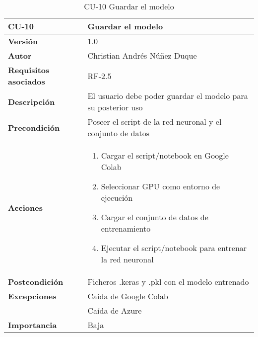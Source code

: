\begin{table}[p]
	\centering
	\begin{tabularx}{\linewidth}{ p{} p{} }
		\toprule
		\textbf{CU-10}    & \textbf{Guardar el modelo}\\
		\toprule
		\textbf{Versión}              & 1.0    \\
		\textbf{Autor}                & Christian Andrés Núñez Duque \\
		\textbf{Requisitos asociados} & RF-2.5 \\
		\textbf{Descripción}          & El usuario debe poder guardar el modelo para su posterior uso \\
		\textbf{Precondición}         & Poseer el script de la red neuronal y el conjunto de datos \\
		\textbf{Acciones}             &
		\begin{enumerate}
			\def\labelenumi{\arabic{enumi}.}
			\tightlist
			\item Cargar el script/notebook en Google Colab
			\item Seleccionar GPU como entorno de ejecución
			\item Cargar el conjunto de datos de entrenamiento
			\item Ejecutar el script/notebook para entrenar la red neuronal
		\end{enumerate}\\
		\textbf{Postcondición}        & Ficheros .keras y .pkl con el modelo entrenado \\
		\textbf{Excepciones}          & Caída de Google Colab \\ & Caída de Azure \\
		\textbf{Importancia}          & Baja \\
		\bottomrule
	\end{tabularx}
	\caption{CU-10 Guardar el modelo}
\end{table}

